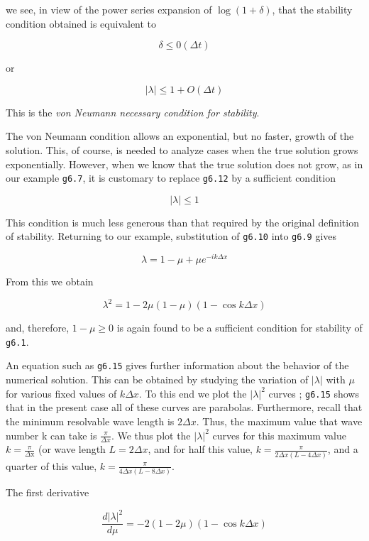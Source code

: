 we see, in view of the power series expansion of
\(\log\left( 1 + \delta \right)\), that the stability condition obtained
is equivalent to

\[\delta \leq 0\left( \Delta t \right)\]

or

    \[|\lambda| \leq 1 + O (\Delta t)\]

This is the \emph{von Neumann necessary condition for stability}.

The von Neumann condition allows an exponential, but no faster, growth
of the solution. This, of course, is needed to analyze cases when the
true solution grows exponentially. However, when we know that the true
solution does not grow, as in our example \texttt{g6.7}, it is customary
to replace \texttt{g6.12} by a sufficient condition

    \[|\lambda| \leq 1\]

This condition is much less generous than that required by the original
definition of stability. Returning to our example, substitution of
\texttt{g6.10} into \texttt{g6.9} gives

    \[\lambda = 1 - \mu + \mu e^{-ik\Delta x}\]

From this we obtain

    \[\lambda^{2} =1 - 2\mu\left( 1 - \mu \right)\left( 1 - \cos{k\Delta x} \right)\]

and, therefore, \(1 - \mu \geq 0 \) is again found to be a sufficient
condition for stability of \texttt{g6.1}.

An equation such as \texttt{g6.15} gives further information about the
behavior of the numerical solution. This can be obtained by studying the
variation of \(|\lambda|\) with \(\mu\) for various fixed values of
\(k\Delta x\). To this end we plot the \(|\lambda|^{2}\) curves ;
\texttt{g6.15} shows that in the present case all of these curves are
parabolas. Furthermore, recall that the minimum resolvable wave length
is \(2 \Delta x\). Thus, the maximum value that wave number k can take
is \(\frac{\pi}{\Delta x}\). We thus plot the \(|\lambda|^{2}\) curves
for this maximum value \(k = \frac{\pi}{\Delta\text{x}}\) (or wave
length \(L = 2\Delta x\), and for half this value,
\(k = \frac{\pi}{2\Delta x\left( L - 4\Delta x \right)}\), and a quarter
of this value,
\(k = \frac{\pi}{4\Delta x\left( L - 8\Delta x \right)}\).

The first derivative

\[\frac{d|\lambda|^2}{d\mu} = - 2( 1 - 2\mu)( 1 - \cos{k \Delta x} )\]

